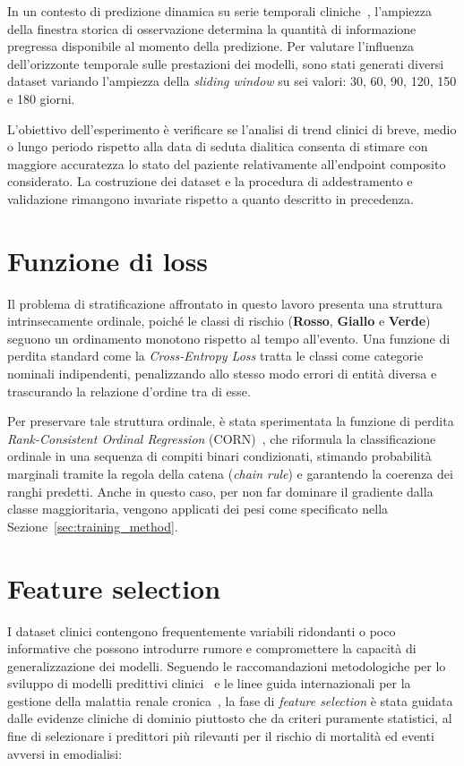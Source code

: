\documentclass[a4paper,12pt]{report}
\begin{document}
In un contesto di predizione dinamica su serie temporali cliniche~\cite{VANHOUWELINGENDL2006}, l'ampiezza della finestra storica di osservazione determina la quantità di informazione pregressa disponibile al momento della predizione. Per valutare l'influenza dell'orizzonte temporale sulle prestazioni dei modelli, sono stati generati diversi dataset variando l'ampiezza della \textit{sliding window} su sei valori: 30, 60, 90, 120, 150 e 180 giorni.

L'obiettivo dell'esperimento è verificare se l'analisi di trend clinici di breve, medio o lungo periodo rispetto alla data di seduta dialitica consenta di stimare con maggiore accuratezza lo stato del paziente relativamente all'endpoint composito considerato. La costruzione dei dataset e la procedura di addestramento e validazione rimangono invariate rispetto a quanto descritto in precedenza.

\section{Funzione di loss}
\label{sec:loss_function}

Il problema di stratificazione affrontato in questo lavoro presenta una struttura intrinsecamente ordinale, poiché le classi di rischio (\textbf{Rosso}, \textbf{Giallo} e \textbf{Verde}) seguono un ordinamento monotono rispetto al tempo all'evento. Una funzione di perdita standard come la \textit{Cross-Entropy Loss} tratta le classi come categorie nominali indipendenti, penalizzando allo stesso modo errori di entità diversa e trascurando la relazione d'ordine tra di esse.

Per preservare tale struttura ordinale, è stata sperimentata la funzione di perdita \textit{Rank-Consistent Ordinal Regression} (CORN)~\cite{shi2021deep}, che riformula la classificazione ordinale in una sequenza di compiti binari condizionati, stimando probabilità marginali tramite la regola della catena (\textit{chain rule}) e garantendo la coerenza dei ranghi predetti. Anche in questo caso, per non far dominare il gradiente dalla classe maggioritaria, vengono applicati dei pesi come specificato nella Sezione~\ref{sec:training_method}.

\section{Feature selection}
\label{sec:feature_selection}

I dataset clinici contengono frequentemente variabili ridondanti o poco informative che possono introdurre rumore e compromettere la capacità di generalizzazione dei modelli. Seguendo le raccomandazioni metodologiche per lo sviluppo di modelli predittivi clinici~\cite{Efthimioue078276} e le linee guida internazionali per la gestione della malattia renale cronica~\cite{2024S117}, la fase di \textit{feature selection} è stata guidata dalle evidenze cliniche di dominio piuttosto che da criteri puramente statistici, al fine di selezionare i predittori più rilevanti per il rischio di mortalità ed eventi avversi in emodialisi:
\end{document}
